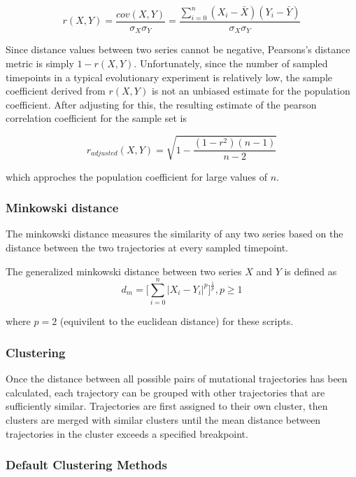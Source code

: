 \documentclass{report}
\begin{document}
\begin{equation}
r(X,Y) = \frac{cov(X,Y)}{\sigma_X \sigma_Y} =
\frac{\sum_{i=0}^n (X_i-\bar{X})(Y_i-\bar{Y})}{\sigma_X \sigma_Y}
\end{equation}

Since distance values between two series cannot be negative, Pearsons's distance metric is simply $1-r(X,Y)$. Unfortunately, since the number of sampled timepoints in a typical evolutionary experiment is relatively low, the sample coefficient derived from $r(X,Y)$ is not an unbiased estimate for the population coefficient. After adjusting for this, the resulting estimate of the pearson correlation coefficient for the sample set is

\begin{equation}
r_{adjusted}(X,Y) = \sqrt{1-\frac{(1-r^2)(n-1)}{n-2}}
\end{equation}

which approches the population coefficient for large values of $n$.


\subsubsection{Minkowski distance}
The minkowski distance measures the similarity of any two series based on the distance between the two trajectories at every sampled timepoint.

The generalized minkowski distance between two series $X$ and $Y$ is defined as
\begin{equation}
d_m=\bigg[\sum_{i=0}^n|X_i-Y_i|^p\bigg]^\frac{1}{p}, p \ge 1
\end{equation}

where $p=2$ (equivilent to the euclidean distance) for these scripts.

\subsubsection{Clustering}

Once the distance between all possible pairs of mutational trajectories has been calculated, each trajectory can be grouped with other trajectories that are sufficiently similar. Trajectories are first assigned to their own cluster, then clusters are merged with similar clusters until the mean distance between trajectories in the cluster exceeds a specified breakpoint.

\subsubsection{Default Clustering Methods}
\end{document}
